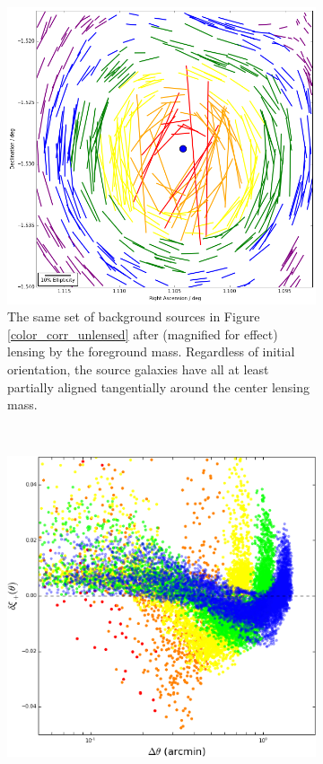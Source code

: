\documentclass[%
 reprint,
 amsmath,amssymb,
 aps,nofootinbib
]{revtex4-1}
\begin{document}
\begin{figure}
    \centering
    \begin{subfigure}{0.44\textwidth}
        \includegraphics[width=\textwidth]{figs-swe/corr_visualization_lensed.png}
        \captionsetup{justification=raggedright,singlelinecheck=false}
        \caption{The same set of background sources in Figure \ref{color_corr_unlensed} after (magnified for effect) lensing by the foreground mass. Regardless of initial orientation, the source galaxies have all at least partially aligned tangentially around the center lensing mass.}
        \label{color_corr_lensed}
    \end{subfigure}
    ~
    \begin{subfigure}{0.44\textwidth}
        \includegraphics[width=\textwidth]{figs-swe/corr_dist_lensed.png}

\end{subfigure}
\end{figure}
\end{document}

